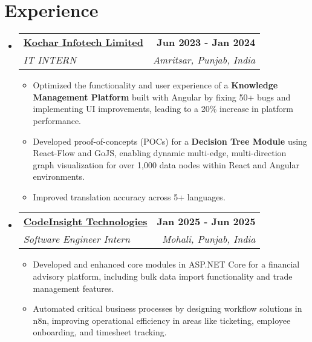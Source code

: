 \documentclass[letterpaper,11pt]{article}
\makeatletter
\newcommand{\resumeItem}[1]{
  \item\small{
    {#1 \vspace{-2pt}}
  }
}
\newcommand{\resumeSubheading}[4]{
  \vspace{-2pt}\item
    \begin{tabular*}{1.0\textwidth}[t]{l@{\extracolsep{\fill}}r}
      \textbf{#1} & \textbf{\small #2} \\
      \textit{\small#3} & \textit{\small #4} \\
    \end{tabular*}\vspace{-7pt}
}
\newcommand{\resumeSubHeadingListStart}{\begin{itemize}[leftmargin=0.0in, label={}]}
\newcommand{\resumeSubHeadingListEnd}{\end{itemize}}
\newcommand{\resumeItemListStart}{\justify \begin{itemize} \vspace{-4pt}}
\newcommand{\resumeItemListEnd}{\end{itemize}\vspace{-1pt}}
\makeatother
\begin{document}
\section{Experience}
  \resumeSubHeadingListStart
    \resumeSubheading
      {\href{https://www.kochartech.com/}{Kochar Infotech Limited}}{Jun 2023 - Jan 2024}
      {IT INTERN}{Amritsar, Punjab, India}
      \resumeItemListStart
        \resumeItem{Optimized the functionality and user experience of a \textbf{Knowledge Management Platform} built with Angular by fixing 50+ bugs and implementing UI improvements, leading to a 20\% increase in platform performance.}
        \resumeItem{Developed proof-of-concepts (POCs) for a \textbf{Decision Tree Module} using React-Flow and GoJS, enabling dynamic multi-edge, multi-direction graph visualization for over 1,000 data nodes within React and Angular environments.}
        \resumeItem{Improved translation accuracy across 5+ languages.}
      \resumeItemListEnd
    
    \resumeSubheading
      {\href{https://www.thecodeinsight.com/}{CodeInsight Technologies}}{Jan 2025 - Jun 2025}
      {Software Engineer Intern}{Mohali, Punjab, India}
      \resumeItemListStart
        \resumeItem{Developed and enhanced core modules in ASP.NET Core for a financial advisory platform, including bulk data import functionality and trade management features.}
        \resumeItem{Automated critical business processes by designing workflow solutions in n8n, improving operational efficiency in areas like ticketing, employee onboarding, and timesheet tracking.}
      \resumeItemListEnd
  \resumeSubHeadingListEnd




\end{document}
